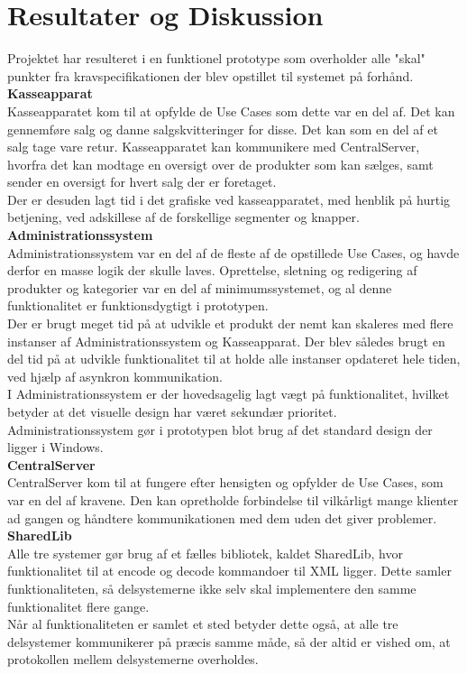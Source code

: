 \section{Resultater og Diskussion}
Projektet har resulteret i en funktionel prototype som overholder alle "skal" punkter fra kravspecifikationen der blev opstillet til systemet på forhånd.\\

\textbf{Kasseapparat}\\
Kasseapparatet kom til at opfylde de Use Cases som dette var en del af. Det kan gennemføre salg og danne salgskvitteringer for disse. Det kan som en del af et salg tage vare retur. Kasseapparatet kan kommunikere med CentralServer, hvorfra det kan modtage en oversigt over de produkter som kan sælges, samt sender en oversigt for hvert salg der er foretaget.\\
Der er desuden lagt tid i det grafiske ved kasseapparatet, med henblik på hurtig betjening, ved adskillese af de forskellige segmenter og knapper.\\

\textbf{Administrationssystem}\\
Administrationssystem var en del af de fleste af de opstillede Use Cases, og havde derfor en masse logik der skulle laves. Oprettelse, sletning og redigering af produkter og kategorier var en del af minimumssystemet, og al denne funktionalitet er funktionsdygtigt i prototypen.\\
Der er brugt meget tid på at udvikle et produkt der nemt kan skaleres med flere instanser af Administrationssystem og Kasseapparat. Der blev således brugt en del tid på at udvikle funktionalitet til at holde alle instanser opdateret hele tiden, ved hjælp af asynkron kommunikation.\\
I Administrationssystem er der hovedsagelig lagt vægt på funktionalitet, hvilket betyder at det visuelle design har været sekundær prioritet. Administrationssystem gør i prototypen blot brug af det standard design der ligger i Windows.\\

\textbf{CentralServer}\\
CentralServer kom til at fungere efter hensigten og opfylder de Use Cases, som var en del af kravene. Den kan opretholde forbindelse til vilkårligt mange klienter ad gangen og håndtere kommunikationen med dem uden det giver problemer.\\

\textbf{SharedLib}\\
Alle tre systemer gør brug af et fælles bibliotek, kaldet SharedLib, hvor funktionalitet til at encode og decode kommandoer til XML ligger. Dette samler funktionaliteten, så delsystemerne ikke selv skal implementere den samme funktionalitet flere gange.\\
Når al funktionaliteten er samlet et sted betyder dette også, at alle tre delsystemer kommunikerer på præcis samme måde, så der altid er vished om, at protokollen mellem delsystemerne overholdes.\\
